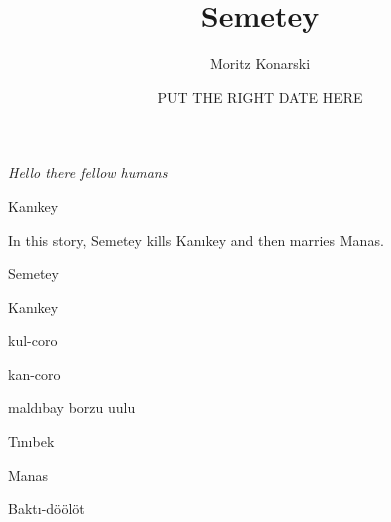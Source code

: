\documentclass[12pt,a4paper]{article}
\newcommand{\Se}{Semetey}               %
\newcommand{\Ka}{Kanıkey}               %
\newcommand{\Kuc}{kul-coro}             %
\newcommand{\Kac}{kan-coro}             %
\newcommand{\Mb}{maldıbay borzu uulu}   %
\newcommand{\Tj}{Tınıbek}               %
\newcommand{\Ma}{Manas}                 %
\newcommand{\Bd}{Baktı-döölöt}
\begin{document}
\title{Semetey}
\author{Moritz Konarski}
\date{PUT THE RIGHT DATE HERE}
\maketitle

\emph{Hello there fellow humans}

Kanıkey


In this story, \Se{} kills \Ka{} and then marries \Ma{}.

\Se{}

\Ka{}

\Kuc{}

\Kac{}

\Mb{}

\Tj{}

\Ma{}

\Bd{}
\end{document}
